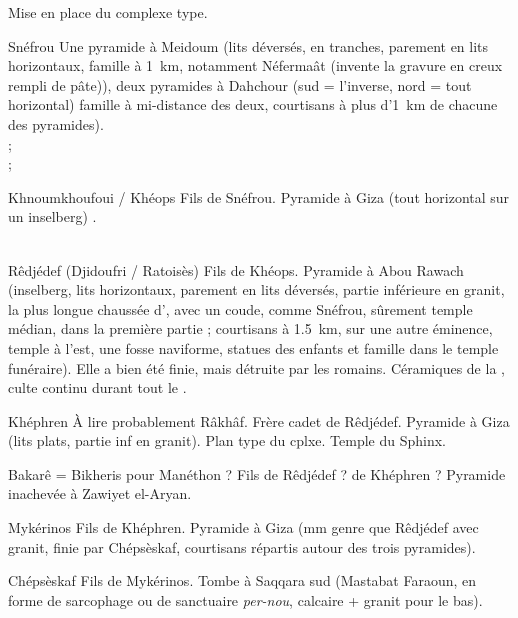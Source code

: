 Mise en place du complexe type.
                  
\begin{listerois}
  \item [Snéfrou] Une pyramide à Meidoum (lits déversés, en tranches, 
        parement en lits horizontaux, famille à \SI{1}{\km}, notamment 
        Néfermaât (invente la gravure en creux rempli de pâte)), deux 
        pyramides à Dahchour (sud = l'inverse, nord = tout horizontal) 
        famille à mi-distance des deux, courtisans à plus 
        d'\SI{1}{\km} de chacune des pyramides). \\
         ; \\
         ; \\
  \item [Khnoumkhoufoui / Khéops] Fils de Snéfrou. Pyramide à Giza 
        (tout horizontal sur un inselberg) . \\
         \\
  \item [Rêdjédef (Djidoufri / Ratoisès)] Fils de Khéops. 
        Pyramide à Abou Rawach (inselberg, lits horizontaux, parement 
        en lits déversés, partie inférieure en granit, la plus longue 
        chaussée d'\kmt, avec un coude, comme Snéfrou, sûrement temple 
        médian, dans la première partie ;
        courtisans à \SI{1.5}{\km}, sur une autre éminence, temple à 
        l'est, une fosse naviforme, statues des enfants et famille 
        dans le temple funéraire).
        Elle a bien été finie, mais détruite par les romains. 
        Céramiques de la , culte continu durant tout le \MK.
  \item [Khéphren] À lire probablement Râkhâf. Frère cadet de 
        Rêdjédef. Pyramide à Giza (lits plats, partie inf en granit). 
        Plan type du cplxe. Temple du Sphinx.
  \item [Bakarê] = Bikheris pour Manéthon ? Fils de Rêdjédef ? 
        de Khéphren ? 
        Pyramide inachevée à Zawiyet el-Aryan.
  \item [Mykérinos] Fils de Khéphren. Pyramide à Giza (mm genre que 
        Rêdjédef avec granit, finie par Chépsèskaf, courtisans 
        répartis autour des trois pyramides).
  \item [Chépsèskaf] Fils de Mykérinos. Tombe à Saqqara sud 
        (Mastabat Faraoun, en forme de sarcophage ou de sanctuaire 
        \emph{per-nou}, calcaire + granit pour le bas). \\
\end{listerois}

